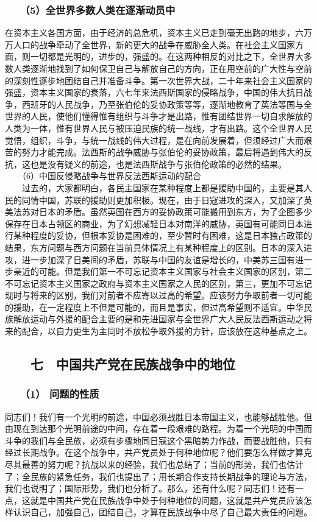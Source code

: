 \documentclass[cn,11pt,chinese]{elegantbook}
\def\myformat#1{\hfil\hfil #1}
\begin{document}
\subsubsection*{\myformat{　　（5）全世界多数人类在逐渐动员中}}
在资本主义各国方面，由于经济的总危机，资本主义已走到毫无出路的地步，六万万人口的战争牵动了全世界，新的更大的战争在威胁全人类。在社会主义国家方面，则一切都是光明的，进步的，强盛的。在这两种相反的对比之下，全世界大多数人类逐渐地找到了如何保卫自己与解放自己的方向，正在用空前的广大性与空前的深刻性逐步地团结自己并准备斗争。第一次世界大战，二十年来社会主义国家的强盛，资本主义国家的衰落，六七年来法西斯国家的侵略战争，中国的伟大抗日战争，西班牙的人民战争，乃至张伯伦的妥协政策等等，逐渐地教育了英法等国与全世界的人民，使他们懂得惟有组织与斗争才是出路，惟有团结世界一切自求解放的人类为一体，惟有世界人民与被压迫民族的统一战线，才有出路。这个全世界人民觉悟，组织，斗争，与统一战线的伟大过程，是在向前发展着，但须经过广大而艰苦的努力才能完成。法西斯的战争威胁与张伯伦的妥协政策，最后将遇到伟大的反抗，这也是没有疑义的前途，也是法西斯战争与张伯伦政策的必然的结果。\\
　　（6）中国反侵略战争与世界反法西斯运动的配合\\
　　过去的，大家都明白，各民主国家在某种程度上都是援助中国的，主要是其人民的同情中国，苏联的援助则更加积极。现在，由于日寇进攻的深入，又加深了英美法苏对日本的矛盾。虽然英国在西方的妥协政策可能搬用到东方，为了企图多少保存在日本占领区的商业，为了幻想减轻日本对南洋的威胁，英国有可能同日本进行某种程度的妥协，但根本妥协是困难的，至少暂时有困难，这是日本独占政策的结果，东方问题与西方问题在当前具体情况上有某种程度上的区别。日本的深入进攻，进一步加深了日美间的矛盾，苏联与中国的友谊是增长的，中美苏三国有进一步亲近的可能。但是我们第一不可忘记资本主义国家与社会主义国家的区别，第二不可忘记资本主义国家之政府与资本主义国家之人民的区别，第三，更加不可忘记现时与将来的区别，我们对前者不应寄以过高的希望。应该努力争取前者一切可能的援助，在一定程度上不但是可能的，而且是事实，但过高希望则不适宜。中华民族解放运动与外援的配合主要的是和先进国家与全世界广大人民反法西斯运动之将来的配合，以自力更生为主同时不放松争取外援的方针，应该放在这种基点之上。\\
\subsection*{\myformat{　　七　中国共产党在民族战争中的地位}}
\subsubsection*{\myformat{　　（1） 问题的性质}}
同志们！我们有一个光明的前途，中国必须战胜日本帝国主义，也能够战胜他。但由现在到达那个光明前途的中间，存在着一段艰难的路程。为着一个光明的中国而斗争的我们与全民族，必须有步骤地同日寇这个黑暗势力作战，而要战胜他，只有经过长期战争。在这个战争中，共产党员处于何种地位呢？他们要怎么样做才算克尽其最善的努力呢？抗战以来的经验，我们也总结了；当前的形势，我们也估计了；全民族的紧急任务，我们也提出了；用长期合作支持长期战争的理论与方法，我们也说明了；国际形势，我们也分析了。那么，还有什么呢？同志们！还有一点，这就是中国共产党在民族战争中处于何种地位的问题，这就是共产党员应该怎样认识自己，加强自己，团结自己，才算在民族战争中尽了自己最大责任的问题。\\
\end{document}
